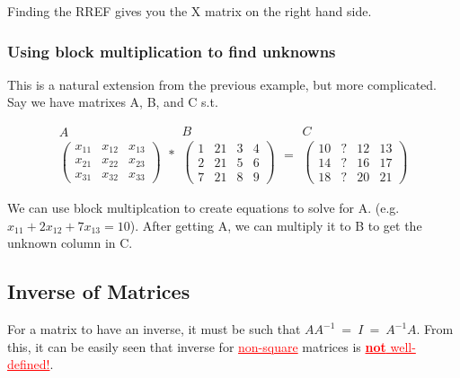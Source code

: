 \documentclass{article}
\newcommand{\rul}[1]{\textcolor{red}{\underline{#1}}}
\begin{document}
Finding the RREF gives you the X matrix on the right hand side.

\subsubsection{Using block multiplication to find unknowns}
This is a natural extension from the previous example, but more complicated. Say we have matrixes A, B, and C s.t.

\[
\begin{array}{c}
    A \\
    \begin{pmatrix}
        x_{11} & x_{12} & x_{13} \\
        x_{21} & x_{22} & x_{23} \\
        x_{31} & x_{32} & x_{33}
    \end{pmatrix}
\end{array}
* 
\begin{array}{c}
    B \\
    \begin{pmatrix}
        1 & 21 & 3 & 4 \\
        2 & 21 & 5 & 6 \\
        7 & 21 & 8 & 9
    \end{pmatrix}
\end{array}
=
\begin{array}{c}
    C \\
    \begin{pmatrix}
        10 & \mathbf{?} & 12 & 13 \\
        14 & \mathbf{?} & 16 & 17 \\
        18 & \mathbf{?} & 20 & 21
    \end{pmatrix}
\end{array}
\]

We can use block multiplcation to create equations to solve for A. (e.g. ${x_{11} + 2x_{12} + 7x_{13} = 10}$). After getting A, we can multiply it to B to get the unknown column in C.

\subsection{Inverse of Matrices}
For a matrix to have an inverse, it must be such that $AA^{-1}\ =\ I\ =\ A^{-1}A$. From this, it can be easily seen that inverse for \rul{non-square} matrices is \rul{\textbf{not} well-defined!}.

\vspace{10pt}
\end{document}
